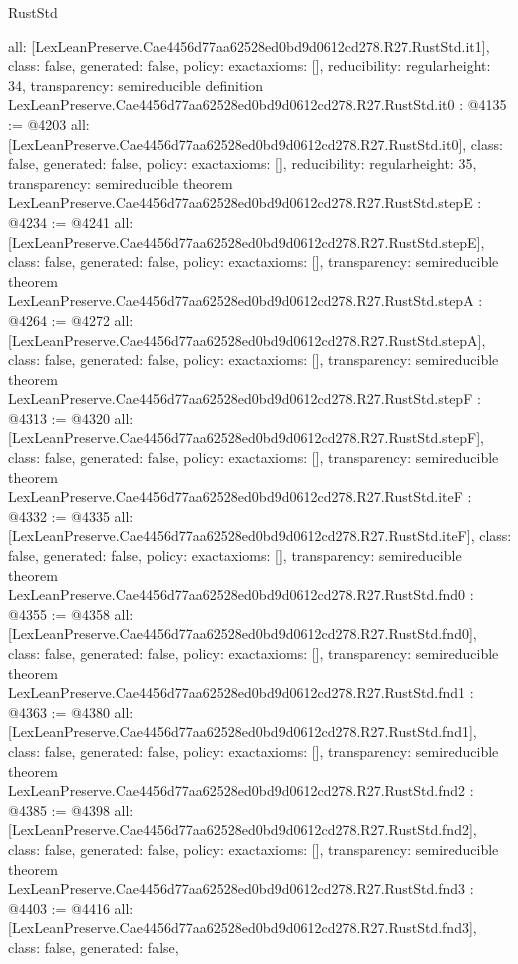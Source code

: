 \begin{lexlean}{RustStd}
\begin{coremodule}
{  all: [LexLeanPreserve.Cae4456d77aa62528ed0bd9d0612cd278.R27.RustStd.it1],
  class: false,
  generated: false,
  policy: exact{axioms: []},
  reducibility: regular{height: 34},
  transparency: semireducible
}
definition LexLeanPreserve.Cae4456d77aa62528ed0bd9d0612cd278.R27.RustStd.it0 : @4135 := @4203 {
  all: [LexLeanPreserve.Cae4456d77aa62528ed0bd9d0612cd278.R27.RustStd.it0],
  class: false,
  generated: false,
  policy: exact{axioms: []},
  reducibility: regular{height: 35},
  transparency: semireducible
}
theorem LexLeanPreserve.Cae4456d77aa62528ed0bd9d0612cd278.R27.RustStd.stepE : @4234 := @4241 {
  all: [LexLeanPreserve.Cae4456d77aa62528ed0bd9d0612cd278.R27.RustStd.stepE],
  class: false,
  generated: false,
  policy: exact{axioms: []},
  transparency: semireducible
}
theorem LexLeanPreserve.Cae4456d77aa62528ed0bd9d0612cd278.R27.RustStd.stepA : @4264 := @4272 {
  all: [LexLeanPreserve.Cae4456d77aa62528ed0bd9d0612cd278.R27.RustStd.stepA],
  class: false,
  generated: false,
  policy: exact{axioms: []},
  transparency: semireducible
}
theorem LexLeanPreserve.Cae4456d77aa62528ed0bd9d0612cd278.R27.RustStd.stepF : @4313 := @4320 {
  all: [LexLeanPreserve.Cae4456d77aa62528ed0bd9d0612cd278.R27.RustStd.stepF],
  class: false,
  generated: false,
  policy: exact{axioms: []},
  transparency: semireducible
}
theorem LexLeanPreserve.Cae4456d77aa62528ed0bd9d0612cd278.R27.RustStd.iteF : @4332 := @4335 {
  all: [LexLeanPreserve.Cae4456d77aa62528ed0bd9d0612cd278.R27.RustStd.iteF],
  class: false,
  generated: false,
  policy: exact{axioms: []},
  transparency: semireducible
}
theorem LexLeanPreserve.Cae4456d77aa62528ed0bd9d0612cd278.R27.RustStd.fnd0 : @4355 := @4358 {
  all: [LexLeanPreserve.Cae4456d77aa62528ed0bd9d0612cd278.R27.RustStd.fnd0],
  class: false,
  generated: false,
  policy: exact{axioms: []},
  transparency: semireducible
}
theorem LexLeanPreserve.Cae4456d77aa62528ed0bd9d0612cd278.R27.RustStd.fnd1 : @4363 := @4380 {
  all: [LexLeanPreserve.Cae4456d77aa62528ed0bd9d0612cd278.R27.RustStd.fnd1],
  class: false,
  generated: false,
  policy: exact{axioms: []},
  transparency: semireducible
}
theorem LexLeanPreserve.Cae4456d77aa62528ed0bd9d0612cd278.R27.RustStd.fnd2 : @4385 := @4398 {
  all: [LexLeanPreserve.Cae4456d77aa62528ed0bd9d0612cd278.R27.RustStd.fnd2],
  class: false,
  generated: false,
  policy: exact{axioms: []},
  transparency: semireducible
}
theorem LexLeanPreserve.Cae4456d77aa62528ed0bd9d0612cd278.R27.RustStd.fnd3 : @4403 := @4416 {
  all: [LexLeanPreserve.Cae4456d77aa62528ed0bd9d0612cd278.R27.RustStd.fnd3],
  class: false,
  generated: false,
}
\end{coremodule}
\end{lexlean}

